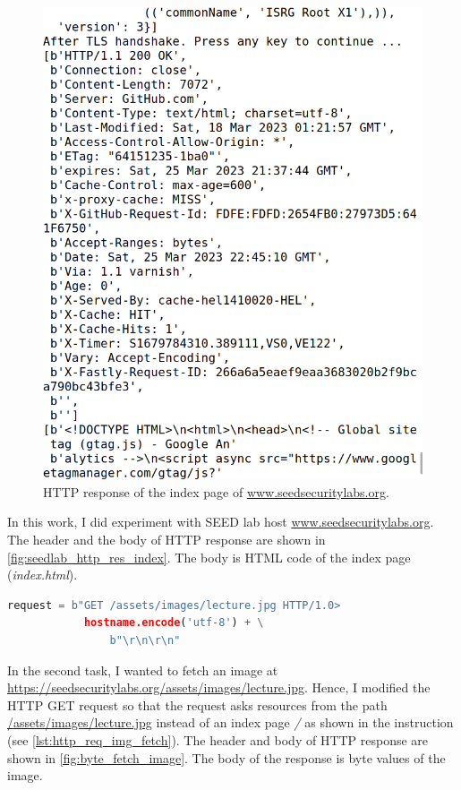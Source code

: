 \begin{figure}
    \centering
    \includegraphics[height=\textheight,width=\textwidth,keepaspectratio]
    {figures/http_req_index.png}
    \caption{HTTP response of the index page of \url{www.seedsecuritylabs.org}.}
    \label{fig:seedlab_http_res_index}
\end{figure}

In this work, I did experiment with SEED lab host \url{www.seedsecuritylabs.org}.
The header and the body of HTTP response are shown in \autoref{fig:seedlab_http_res_index}.
The body is HTML code of the index page (\emph{index.html}).

\begin{lstlisting}[language=python, caption=A modified HTTP GET request,
    label={lst:http_req_img_fetch}]
request = b"GET /assets/images/lecture.jpg HTTP/1.0>
            hostname.encode('utf-8') + \
                b"\r\n\r\n"
\end{lstlisting}

In the second task, I wanted to
fetch an image at \url{https://seedsecuritylabs.org/assets/images/lecture.jpg}. Hence, I modified
the HTTP GET request so that the request asks resources from the path \url{/assets/images/lecture.jpg}
instead of an index page \emph{/} as shown in the instruction (see
\autoref{lst:http_req_img_fetch}). The header and body of HTTP response are shown in
\autoref{fig:byte_fetch_image}. The body of the response is byte values of the image.


